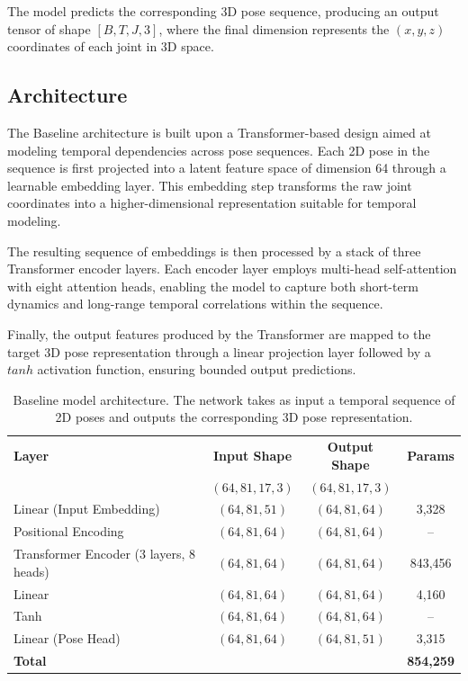The model predicts the corresponding 3D pose sequence, producing an output tensor of shape $[B, T, J, 3]$, where the final dimension represents the $(x, y, z)$ coordinates of each joint in 3D space.

\subsection{Architecture}
The Baseline architecture is built upon a Transformer-based design aimed at modeling temporal dependencies across pose sequences. Each 2D pose in the sequence is first projected into a latent feature space of dimension 64 through a 
learnable embedding layer. This embedding step transforms the raw joint coordinates into a higher-dimensional representation suitable for temporal modeling.

The resulting sequence of embeddings is then processed by a stack of three Transformer encoder layers. Each encoder layer employs multi-head self-attention with eight attention heads, enabling the model to capture both short-term 
dynamics and long-range temporal correlations within the sequence.

Finally, the output features produced by the Transformer are mapped to the target 3D pose representation through a linear projection layer followed by a $tanh$ activation function, ensuring bounded output predictions.

\begin{table}[t]
    \centering
    \caption{Baseline model architecture. The network takes as input a temporal sequence of 2D poses and outputs the corresponding 3D pose representation.}
    \label{tab:baseline_architecture}
    \renewcommand{\arraystretch}{1.2}
    \begin{tabular}{lccc}
    \hline
    \textbf{Layer} & \textbf{Input Shape} & \textbf{Output Shape} & \textbf{Params} \\
                   & $(64, 81, 17, 3)$ & $(64, 81, 17, 3)$ &  \\
    \hline
    Linear (Input Embedding) & $(64, 81, 51)$ & $(64, 81, 64)$ & 3,328 \\
    \hline
    Positional Encoding & $(64, 81, 64)$ & $(64, 81, 64)$ & -- \\
    Transformer Encoder (3 layers, 8 heads) & $(64, 81, 64)$ & $(64, 81, 64)$ & 843,456 \\
    \hline
    Linear & $(64, 81, 64)$ & $(64, 81, 64)$ & 4,160 \\
    Tanh & $(64, 81, 64)$ & $(64, 81, 64)$ & -- \\
    Linear (Pose Head) & $(64, 81, 64)$ & $(64, 81, 51)$ & 3,315 \\
    \hline
    \textbf{Total} &  &  & \textbf{854,259} \\
    \hline
    \end{tabular}
\end{table}


